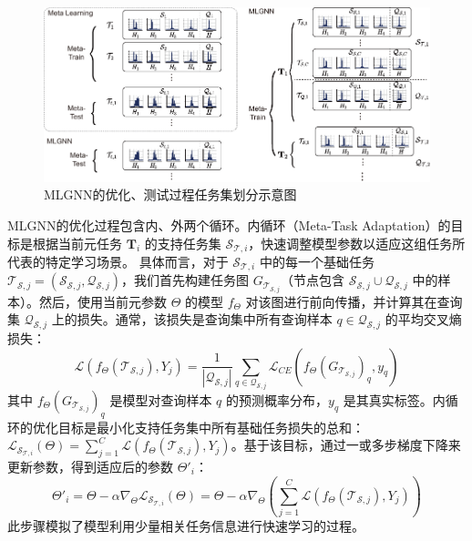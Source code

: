 \begin{figure}[h]
    \centering
    \includegraphics[width=\linewidth]{figures/mlgnn.pdf}
    \caption{MLGNN的优化、测试过程任务集划分示意图}
    \label{fig:mlgnn_structure} %
\end{figure}

MLGNN的优化过程包含内、外两个循环。内循环（Meta-Task Adaptation）的目标是根据当前元任务 $\mathbf{T}_i$ 的支持任务集 $\mathcal{S}_{\mathcal{T},i}$，快速调整模型参数以适应这组任务所代表的特定学习场景。 具体而言，对于 $\mathcal{S}_{\mathcal{T},i}$ 中的每一个基础任务 $\mathcal{T}_{\mathcal{S},j} = (\mathcal{S}_{\mathcal{S},j}, \mathcal{Q}_{\mathcal{S},j})$，我们首先构建任务图 $G_{\mathcal{T}_{\mathcal{S},j}}$（节点包含 $\mathcal{S}_{\mathcal{S},j} \cup \mathcal{Q}_{\mathcal{S},j}$ 中的样本）。然后，使用当前元参数 $\Theta$ 的模型 $f_{\Theta}$ 对该图进行前向传播，并计算其在查询集 $\mathcal{Q}_{\mathcal{S},j}$ 上的损失。通常，该损失是查询集中所有查询样本 $q \in \mathcal{Q}_{\mathcal{S},j}$ 的平均交叉熵损失：
\begin{equation}
    \mathcal{L}(f_{\Theta}(\mathcal{T}_{\mathcal{S},j}), Y_j) = \frac{1}{|\mathcal{Q}_{\mathcal{S},j}|} \sum_{q \in \mathcal{Q}_{\mathcal{S},j}} \mathcal{L}_{CE}(f_{\Theta}(G_{\mathcal{T}_{\mathcal{S},j}})_q, y_q)
    \label{eq:base_task_loss}
\end{equation}
其中 $f_{\Theta}(G_{\mathcal{T}_{\mathcal{S},j}})_q$ 是模型对查询样本 $q$ 的预测概率分布，$y_q$ 是其真实标签。内循环的优化目标是最小化支持任务集中所有基础任务损失的总和：$\mathcal{L}_{\mathcal{S}_{\mathcal{T},i}}(\Theta) = \sum_{j=1}^C \mathcal{L}(f_{\Theta}(\mathcal{T}_{\mathcal{S},j}), Y_j)$。基于该目标，通过一或多步梯度下降来更新参数，得到适应后的参数 $\Theta'_i$：
\begin{equation}
    \Theta'_{i} = \Theta - \alpha \nabla_{\Theta} \mathcal{L}_{\mathcal{S}_{\mathcal{T},i}}(\Theta) = \Theta - \alpha \nabla_{\Theta} \left( \sum_{j=1}^C \mathcal{L}(f_{\Theta}(\mathcal{T}_{\mathcal{S},j}), Y_j) \right)
    \label{eq:mlgnn_inner_update_rephrased}
\end{equation}
此步骤模拟了模型利用少量相关任务信息进行快速学习的过程。

